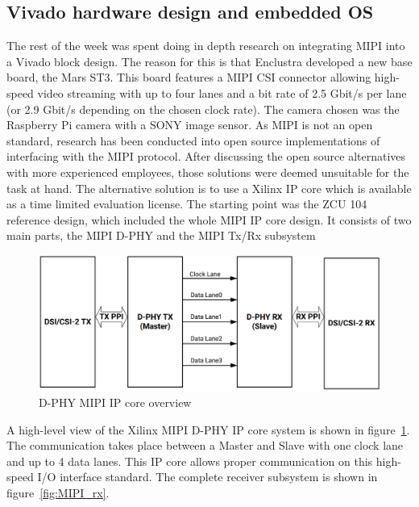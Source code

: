 \subsection{Vivado hardware design and embedded \acs{OS}}
The rest of the week was spent doing in depth research on integrating \ac{MIPI} into a Vivado block design. The reason for this is that Enclustra developed a new base board, the Mars ST3. This board features a \ac{MIPI} \ac{CSI} connector allowing high-speed video streaming with up to four lanes and a bit rate of 2.5 Gbit/s per lane (or 2.9 Gbit/s depending on the chosen clock rate). The camera chosen was the Raspberry Pi camera with a SONY image sensor. As \ac{MIPI} is not an open standard, research has been conducted into open source implementations of interfacing with the \ac{MIPI} protocol. After discussing the open source alternatives with more experienced employees, those solutions were deemed unsuitable for the task at hand. The alternative solution is to use a Xilinx \ac{IP} core which is available as a time limited evaluation license. The starting point was the ZCU 104 reference design, which included the whole \ac{MIPI} \ac{IP} core design. It consists of two main parts, the \ac{MIPI} D-PHY and the \ac{MIPI} Tx/Rx subsystem
\begin{figure}[!htb]
	\centering
		\includegraphics[width=\textwidth]{bilder/MIPI_dphy.png}
		\caption{D-PHY \acs{MIPI} \acs{IP} core overview~\cite{mipi-dphy}}
		\label{fig:mipi_dphy}
\end{figure}
A high-level view of the Xilinx \ac{MIPI} D-PHY \ac{IP} core system is shown in figure~\ref{fig:mipi_dphy}. The communication takes place between a Master and Slave with one clock lane and up to 4 data lanes. This \ac{IP} core allows proper communication on this high-speed I/O interface standard. The complete receiver subsystem is shown in figure~\ref{fig:MIPI_rx}.
